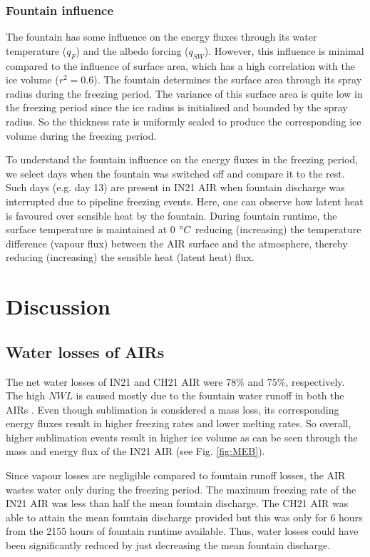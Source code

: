 \documentclass[utf8]{frontiersSCNS} %
\begin{document}
\subsubsection{Fountain influence}

The fountain has some influence on the energy fluxes through its water temperature ($q_{F}$) and the albedo
forcing ($q_{SW}$). However, this influence is minimal compared to the influence of surface area, which has a
high correlation with the ice volume ($r^2=0.6$). The fountain determines the surface area through its spray
radius during the freezing period. The variance of this surface area is quite low in the freezing period since
the ice radius is initialised and bounded by the spray radius. So the thickness rate is uniformly scaled to
produce the corresponding ice volume during the freezing period.

To understand the fountain influence on the energy fluxes in the freezing period, we select days when the
fountain was switched off and compare it to the rest. Such days (e.g. day 13) are present in IN21 AIR when
fountain discharge was interrupted due to pipeline freezing events. Here, one can observe how latent heat is
favoured over sensible heat by the fountain. During fountain runtime, the surface temperature is maintained at 0
$\degree C$ reducing (increasing) the temperature difference (vapour flux) between the AIR surface and the
atmosphere, thereby reducing (increasing) the sensible heat (latent heat) flux.

\section{Discussion}

\subsection{Water losses of AIRs}

The net water losses of IN21 and CH21 AIR were $78\%$ and $75\%$, respectively. The high $NWL$ is caused mostly
due to the fountain water runoff in both the AIRs . Even though sublimation is considered a mass loss, its
corresponding energy fluxes result in higher freezing rates and lower melting rates. So overall, higher
sublimation events result in higher ice volume as can be seen through the mass and energy flux of the IN21 AIR
(see Fig.  \ref{fig:MEB}).

Since vapour losses are negligible compared to fountain runoff losses, the AIR wastes water only during the
freezing period. The maximum freezing rate of the IN21 AIR was less than half the mean fountain discharge. The
CH21 AIR was able to attain the mean fountain discharge provided but this was only for 6 hours from the 2155
hours of fountain runtime available. Thus, water losses could have been significantly reduced by just decreasing
the mean fountain discharge.
\end{document}
